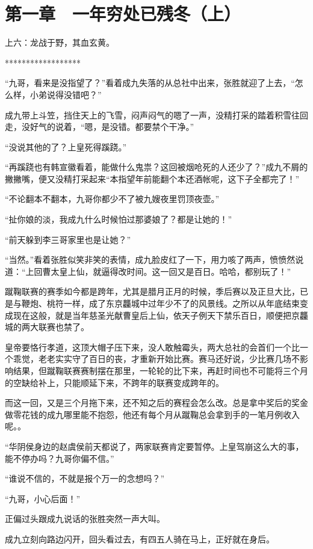 \section{第一章　一年穷处已残冬（上）}

上六：龙战于野，其血玄黄。

******************

“九哥，看来是没指望了？”看着成九失落的从总社中出来，张胜就迎了上去，“怎么样，小弟说得没错吧？”

成九带上斗笠，挡住天上的飞雪，闷声闷气的嗯了一声，没精打采的踏着积雪往回走，没好气的说着，“嗯，是没错。都要禁个干净。”

“没说其他的了？上皇死得蹊跷。”

“再蹊跷也有韩宣徽看着，能做什么鬼祟？这回被烟呛死的人还少了？”成九不屑的撇撇嘴，便又没精打采起来“本指望年前能翻个本还酒帐呢，这下子全都完了！”

“不论翻本不翻本，九哥你都少不了被九嫂夜里罚顶夜壶。”

“扯你娘的淡，我成九什么时候怕过那婆娘了？都是让她的！”

“前天躲到李三哥家里也是让她？”

“当然。”看着张胜似笑非笑的表情，成九脸皮红了一下，用力咳了两声，愤愤然说道：“上回曹太皇上仙，就逼得改时间。这一回又是百日。哈哈，都别玩了！”

蹴鞠联赛的赛季如今都是跨年，尤其是腊月正月的时候，季后赛以及正旦大比，已是与鞭炮、桃符一样，成了东京龘城中过年少不了的风景线。之所以从年底结束变成现在这般，就是当年慈圣光献曹皇后上仙，依天子例天下禁乐百日，顺便把京龘城的两大联赛也禁了。

皇帝要恪行孝道，这顶大帽子压下来，没人敢触霉头，两大总社的会首们一个比一个乖觉，老老实实守了百日的丧，才重新开始比赛。赛马还好说，少比赛几场不影响结果，但蹴鞠联赛赛制摆在那里，一轮轮的比下来，再赶时间也不可能将三个月的空缺给补上，只能顺延下来，不跨年的联赛变成跨年的。

而这一回，又是三个月拖下来，还不知之后的赛程会怎么改。总是拿中奖后的奖金做零花钱的成九哪里能不抱怨，他还有每个月从蹴鞠总会拿到手的一笔月例收入呢。。

“华阴侯身边的赵虞侯前天都说了，两家联赛肯定要暂停。上皇驾崩这么大的事，能不停办吗？九哥你偏不信。”

“谁说不信的，不就是报个万一的念想吗？”

“九哥，小心后面！”

正偏过头跟成九说话的张胜突然一声大叫。

成九立刻向路边闪开，回头看过去，有四五人骑在马上，正好就在身后。

